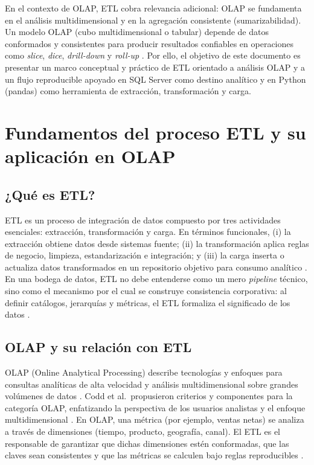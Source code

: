 \documentclass[12pt]{article}
\begin{document}
En el contexto de OLAP, ETL cobra relevancia adicional: OLAP se fundamenta en el análisis multidimensional y en la agregación consistente (sumarizabilidad). Un modelo OLAP (cubo multidimensional o tabular) depende de datos conformados y consistentes para producir resultados confiables en operaciones como \textit{slice}, \textit{dice}, \textit{drill-down} y \textit{roll-up} \cite{ibm_olap,codd_olap}. Por ello, el objetivo de este documento es presentar un marco conceptual y práctico de ETL orientado a análisis OLAP y a un flujo reproducible apoyado en SQL Server como destino analítico y en Python (pandas) como herramienta de extracción, transformación y carga. \cite{ibm_etl,kimball_etl_toolkit,pandas_to_sql}

\section{Fundamentos del proceso ETL y su aplicación en OLAP}
\subsection{¿Qué es ETL?}
ETL es un proceso de integración de datos compuesto por tres actividades esenciales: extracción, transformación y carga. En términos funcionales, (i) la extracción obtiene datos desde sistemas fuente; (ii) la transformación aplica reglas de negocio, limpieza, estandarización e integración; y (iii) la carga inserta o actualiza datos transformados en un repositorio objetivo para consumo analítico \cite{ibm_etl}. En una bodega de datos, ETL no debe entenderse como un mero \textit{pipeline} técnico, sino como el mecanismo por el cual se construye consistencia corporativa: al definir catálogos, jerarquías y métricas, el ETL formaliza el significado de los datos \cite{kimball_etl_toolkit}.

\subsection{OLAP y su relación con ETL}
OLAP (Online Analytical Processing) describe tecnologías y enfoques para consultas analíticas de alta velocidad y análisis multidimensional sobre grandes volúmenes de datos \cite{ibm_olap}. Codd et al.\ propusieron criterios y componentes para la categoría OLAP, enfatizando la perspectiva de los usuarios analistas y el enfoque multidimensional \cite{codd_olap}. En OLAP, una métrica (por ejemplo, ventas netas) se analiza a través de dimensiones (tiempo, producto, geografía, canal). El ETL es el responsable de garantizar que dichas dimensiones estén conformadas, que las claves sean consistentes y que las métricas se calculen bajo reglas reproducibles \cite{kimball_etl_toolkit}.
\end{document}
